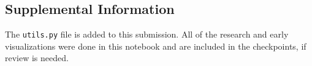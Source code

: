 \documentclass[11pt]{article}
\begin{document}
    \hypertarget{supplemental-information}{%
\subsection{Supplemental Information}\label{supplemental-information}}

    The \texttt{utils.py} file is added to this submission. All of the
research and early visualizations were done in this notebook and are
included in the checkpoints, if review is needed.


    
    
    
    
\end{document}
